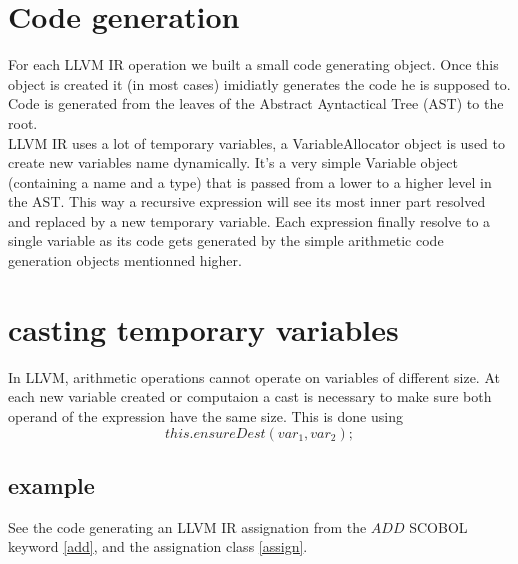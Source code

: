 \section{Code generation}
 
For each LLVM IR operation we built a small code generating object. Once this object is created it (in most cases) imidiatly generates the code he is supposed to.
Code is generated from the leaves of the Abstract Ayntactical Tree (AST) to the root.\\ LLVM IR uses a lot of temporary variables, a VariableAllocator object is used to create new variables name dynamically.
It's a very simple Variable object (containing a name and a type) that is passed from a lower to a higher level in the AST.
This way a recursive expression will see its most inner part resolved and replaced by a new temporary variable. Each expression finally resolve to a single variable as its code gets generated by the simple arithmetic code generation objects mentionned higher.



\section{casting temporary variables}

In LLVM, arithmetic operations cannot operate on variables of different size. At each new variable created or computaion a cast is necessary to make sure both operand of the expression have the same size. This is done using 
$$this.ensureDest(var_1, var_2 );$$

\subsection{example}
See the code generating an LLVM IR assignation from the $ADD$ SCOBOL keyword \ref{add}, and the assignation class \ref{assign}.






\label{add}


\label{assign}

